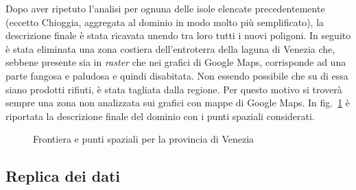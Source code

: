 \documentclass[a4paper,11pt,twoside,openright]{book}							%
\begin{document}
Dopo aver ripetuto l'analisi per ognuna delle isole elencate precedentemente (eccetto Chioggia, aggregata al dominio in modo molto più semplificato), la descrizione finale è stata ricavata unendo tra loro tutti i nuovi poligoni. In seguito è stata eliminata una zona costiera dell'entroterra della laguna di Venezia che, sebbene presente sia in \textit{raster} che nei grafici di Google Maps, corrisponde ad una parte fangosa e paludosa e quindi disabitata. Non essendo possibile che su di essa siano prodotti rifiuti, è stata tagliata dalla regione. Per questo motivo si troverà sempre una zona non analizzata sui grafici con mappe di Google Maps. In fig.~\ref{fig:Ven_rgm} è riportata la descrizione finale del dominio con i punti spaziali considerati.
\begin{figure}[t]
	\centering
	\caption{Frontiera e punti spaziali per la provincia di Venezia}
	\label{fig:Ven_rgm}
\end{figure}

\subsection{Replica dei dati}
\label{sez:comunireplicati}
\end{document}

